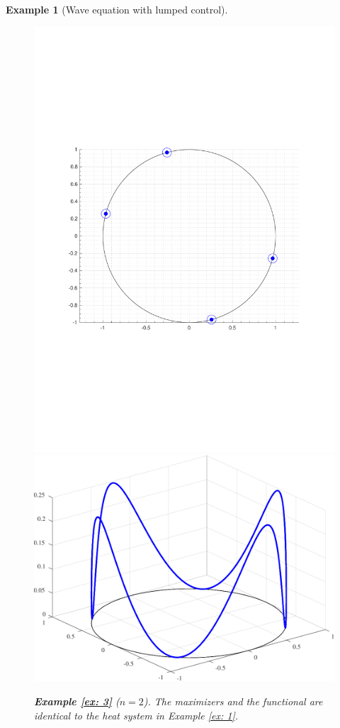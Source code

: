 \documentclass[journal,twoside,web]{ieeecolor}
\newtheorem{example}{Example}
\begin{document}
\begin{example}[Wave equation with lumped control]
	
	\begin{figure}
	\includegraphics[scale=0.265]{figures/wave_opt}
	\hspace{0.1cm}
	\includegraphics[scale=0.265]{figures/wave}
	\caption{\textbf{Example \ref{ex: 3}} ($n=2$).  The maximizers and the functional are identical to the heat system in Example \ref{ex: 1}.}
	\label{fig: ex3.1}
	\end{figure}
	

\end{example}
\end{document}
